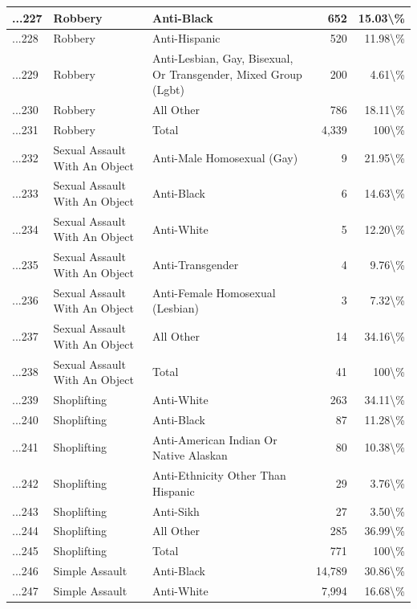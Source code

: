 \documentclass[
]{krantz}
\begin{document}
\begin{longtable}[t]{l|l|l|r|r}
\hline
...227 & Robbery & Anti-Black & 652 & 15.03\textbackslash{}\%\\
\hline
...228 & Robbery & Anti-Hispanic & 520 & 11.98\textbackslash{}\%\\
\hline
...229 & Robbery & Anti-Lesbian, Gay, Bisexual, Or Transgender, Mixed Group (Lgbt) & 200 & 4.61\textbackslash{}\%\\
\hline
...230 & Robbery & All Other & 786 & 18.11\textbackslash{}\%\\
\hline
...231 & Robbery & Total & 4,339 & 100\textbackslash{}\%\\
\hline
...232 & Sexual Assault With An Object & Anti-Male Homosexual (Gay) & 9 & 21.95\textbackslash{}\%\\
\hline
...233 & Sexual Assault With An Object & Anti-Black & 6 & 14.63\textbackslash{}\%\\
\hline
...234 & Sexual Assault With An Object & Anti-White & 5 & 12.20\textbackslash{}\%\\
\hline
...235 & Sexual Assault With An Object & Anti-Transgender & 4 & 9.76\textbackslash{}\%\\
\hline
...236 & Sexual Assault With An Object & Anti-Female Homosexual (Lesbian) & 3 & 7.32\textbackslash{}\%\\
\hline
...237 & Sexual Assault With An Object & All Other & 14 & 34.16\textbackslash{}\%\\
\hline
...238 & Sexual Assault With An Object & Total & 41 & 100\textbackslash{}\%\\
\hline
...239 & Shoplifting & Anti-White & 263 & 34.11\textbackslash{}\%\\
\hline
...240 & Shoplifting & Anti-Black & 87 & 11.28\textbackslash{}\%\\
\hline
...241 & Shoplifting & Anti-American Indian Or Native Alaskan & 80 & 10.38\textbackslash{}\%\\
\hline
...242 & Shoplifting & Anti-Ethnicity Other Than Hispanic & 29 & 3.76\textbackslash{}\%\\
\hline
...243 & Shoplifting & Anti-Sikh & 27 & 3.50\textbackslash{}\%\\
\hline
...244 & Shoplifting & All Other & 285 & 36.99\textbackslash{}\%\\
\hline
...245 & Shoplifting & Total & 771 & 100\textbackslash{}\%\\
\hline
...246 & Simple Assault & Anti-Black & 14,789 & 30.86\textbackslash{}\%\\
\hline
...247 & Simple Assault & Anti-White & 7,994 & 16.68\textbackslash{}\%\\

\end{longtable}
\end{document}

